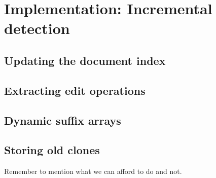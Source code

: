 \chapter{Implementation: Incremental detection}

\section{Updating the document index}

\section{Extracting edit operations}

\section{Dynamic suffix arrays}

\section{Storing old clones}


Remember to mention what we can afford to do and not.
